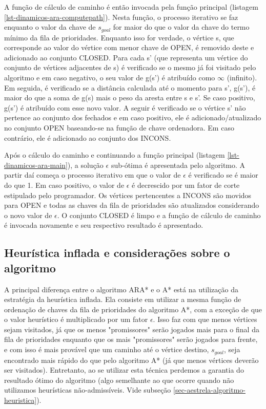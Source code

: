 A função de cálculo de caminho é então invocada pela função principal (listagem \ref{lst-dinamicos-ara-computepath}). Nesta função, o processo iterativo se faz enquanto o valor da chave de $s_{goal}$ for maior do que o valor da chave do termo mínimo da fila de prioridades. Enquanto isso for verdade, o vértice s, que corresponde ao valor do vértice com menor chave de OPEN, é removido deste e adicionado ao conjunto CLOSED. Para cada s' (que representa um vértice do conjunto de vértices adjacentes de s) é verificado se o mesmo já foi visitado pelo algoritmo e em caso negativo, o seu valor de g(s') é atribuído como $\infty$ (infinito). Em seguida, é verificado se a distância calculada até o momento para s', g(s'), é maior do que a soma de g(s) mais o peso da aresta entre s e s'. Se caso positivo, g(s') é atribuído com esse novo valor. A seguir é verificado se o vértice s' não pertence ao conjunto dos fechados e em caso positivo, ele é adicionado/atualizado no conjunto OPEN baseando-se na função de chave ordenadora. Em caso contrário, ele é adicionado ao conjunto dos INCONS.

Após o cálculo do caminho e continuando a função principal (listagem \ref{lst-dinamicos-ara-main}), a solução $\epsilon$ sub-ótima é apresentada pelo algoritmo. A partir daí começa o processo iterativo em que o valor de $\epsilon$ é verificado se é maior do que 1. Em caso positivo, o valor de $\epsilon$ é decrescido por um fator de corte estipulado pelo programador. Os vértices pertencentes a INCONS são movidos para OPEN e todas as chaves da fila de prioridades são atualizados considerando o novo valor de $\epsilon$. O conjunto CLOSED é limpo e a função de cálculo de caminho é invocada novamente e seu respectivo resultado é apresentado.

\subsection{Heurística inflada e considerações sobre o algoritmo}
\label{sec-dinamicos-ad-consideracoes}

A principal diferença entre o algoritmo ARA* e o A* está na utilização da estratégia da heurística inflada. Ela consiste em utilizar a mesma função de ordenação de chaves da fila de prioridades do algoritmo A*, com a exceção de que o valor heurístico é multiplicado por um fator $\epsilon$. Isso faz com que menos vértices sejam visitados, já que os menos "promissores" serão jogados mais para o final da fila de prioridades enquanto que os mais "promissores" serão jogados para frente, e com isso é mais provável que um caminho até o vértice destino, $s_{goal}$, seja encontrado mais rápido do que pelo algoritmo A* (já que menos vértices deverão ser visitados). Entretanto, ao se utilizar esta técnica perdemos a garantia do resultado ótimo do algoritmo (algo semelhante ao que ocorre quando não utilizamos heurísticas não-admissíveis. Vide subseção \ref{sec-aestrela-algoritmo-heuristica}).

